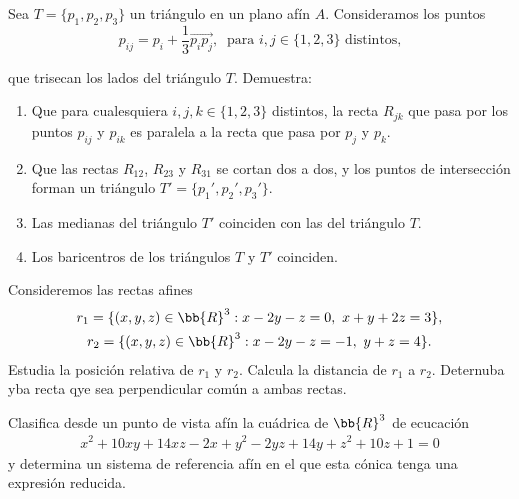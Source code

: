 \documentclass[12pt]{article}
\begin{document}
    \begin{ejercicio}[2 puntos]%
        Sea $T=\{p_1,p_2,p_3\}$ un triángulo en un plano afín $A$. Consideramos los puntos 
        \[
            p_{ij}=p_i + \dfrac{1}{3}\vec{p_ip_j},\ \text{ para }i,j\in\{1,2,3\} \text{ distintos,}
        \]

        que trisecan los lados del triángulo $T$. Demuestra:
        \begin{enumerate}
            \item Que para cualesquiera $i,j,k\in \{1,2,3\}$ distintos, la recta $R_{jk}$ que pasa por los puntos $p_{ij}$ y $p_{ik}$ es paralela a la recta que pasa por $p_{j}$ y $p_{k}$.
            \item Que las rectas $R_{12}$, $R_{23}$ y $R_{31}$ se cortan dos a dos, y los puntos de intersección forman un triángulo $T'=\{p_1',p_2',p_3'\}$.
            \item Las medianas del triángulo $T'$ coinciden con las del triángulo $T$.
            \item Los baricentros de los triángulos $T$ y $T'$ coinciden.
        \end{enumerate}
   \end{ejercicio}

   \begin{ejercicio}[3 puntos]
        Consideremos las rectas afines 
        \begin{gather*}
            r_1=\{(x,y,z)\in \bb{R}^3 : x-2y-z=0,\ x+y+2z=3\},\\
            r_2 = \{(x,y,z) \in \bb{R}^3 : x-2y-z=-1,\ y+z=4\}.
        \end{gather*}
        Estudia la posición relativa de $r_1$ y $r_2$. Calcula la distancia de $r_1$ a $r_2$. Deternuba yba recta qye sea perpendicular común a ambas rectas.
   \end{ejercicio}

   \begin{ejercicio}[3 puntos]
        Clasifica desde un punto de vista afín la cuádrica de $\bb{R}^3$ de ecucación
        \begin{gather*}
            x^2 + 10xy + 14xz - 2x + y^2 - 2yz + 14y + z^2 + 10z + 1 = 0
        \end{gather*}
        y determina un sistema de referencia afín en el que esta cónica tenga una expresión reducida.
   \end{ejercicio}

    
     
\end{document}
